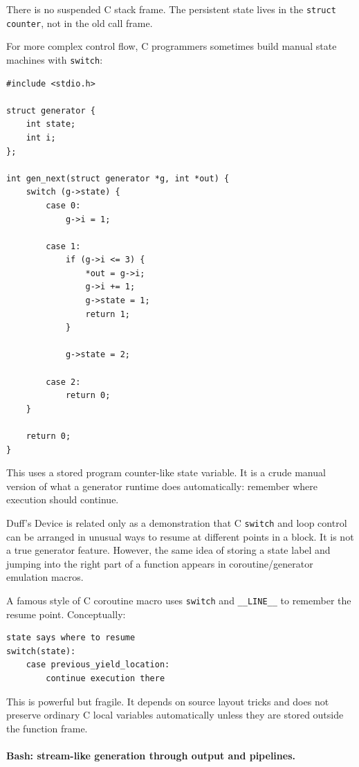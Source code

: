 There is no suspended C stack frame. The persistent state lives in the \texttt{struct counter}, not in the old call frame.

For more complex control flow, C programmers sometimes build manual state machines with \texttt{switch}:

\begin{verbatim}
#include <stdio.h>

struct generator {
    int state;
    int i;
};

int gen_next(struct generator *g, int *out) {
    switch (g->state) {
        case 0:
            g->i = 1;

        case 1:
            if (g->i <= 3) {
                *out = g->i;
                g->i += 1;
                g->state = 1;
                return 1;
            }

            g->state = 2;

        case 2:
            return 0;
    }

    return 0;
}
\end{verbatim}

This uses a stored program counter-like state variable. It is a crude manual version of what a generator runtime does automatically: remember where execution should continue.

Duff's Device is related only as a demonstration that C \texttt{switch} and loop control can be arranged in unusual ways to resume at different points in a block. It is not a true generator feature. However, the same idea of storing a state label and jumping into the right part of a function appears in coroutine/generator emulation macros.

A famous style of C coroutine macro uses \texttt{switch} and \texttt{\_\_LINE\_\_} to remember the resume point. Conceptually:

\begin{verbatim}
state says where to resume
switch(state):
    case previous_yield_location:
        continue execution there
\end{verbatim}

This is powerful but fragile. It depends on source layout tricks and does not preserve ordinary C local variables automatically unless they are stored outside the function frame.

\paragraph{Bash: stream-like generation through output and pipelines.}

